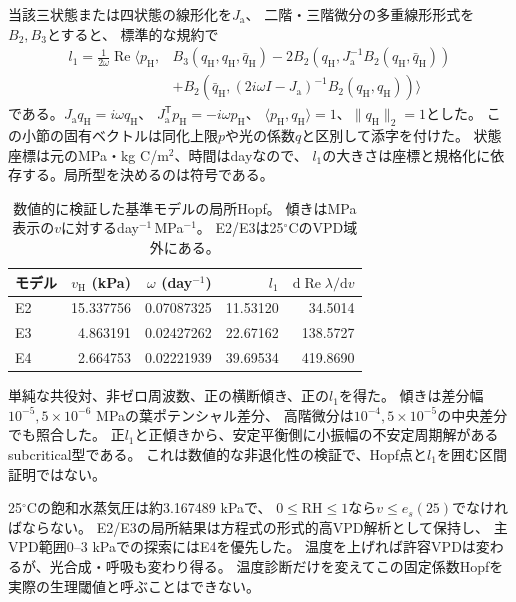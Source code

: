 \documentclass[a4paper,11pt]{ltjsarticle}
\newcommand{\dd}{\mathrm{d}}
\newcommand{\tr}{^{\mathsf T}}
\begin{document}
当該三状態または四状態の線形化を$J_{\mathrm a}$、
二階・三階微分の多重線形形式を$B_2,B_3$とすると、
標準的な規約\cite{kuznetsov}で
\begin{align}\label{eq:l1}
 l_1=\frac{1}{2\omega}\operatorname{Re}\langle p_{\mathrm H},
 &B_3(q_{\mathrm H},q_{\mathrm H},\bar q_{\mathrm H})
 -2B_2(q_{\mathrm H},J_{\mathrm a}^{-1}B_2(q_{\mathrm H},\bar q_{\mathrm H}))\nonumber\\
 &+B_2(\bar q_{\mathrm H},(2i\omega I-J_{\mathrm a})^{-1}
                B_2(q_{\mathrm H},q_{\mathrm H}))\rangle
\end{align}
である。$J_{\mathrm a}q_{\mathrm H}=i\omega q_{\mathrm H}$、
$J_{\mathrm a}\tr p_{\mathrm H}=-i\omega p_{\mathrm H}$、
$\langle p_{\mathrm H},q_{\mathrm H}\rangle=1$、$\|q_{\mathrm H}\|_2=1$とした。
この小節の固有ベクトルは同化上限$p$や光の係数$q$と区別して添字を付けた。
状態座標は元のMPa・kg C/m$^2$、時間はdayなので、
$l_1$の大きさは座標と規格化に依存する。局所型を決めるのは符号である。

\begin{table}[tb]
\centering
\caption{数値的に検証した基準モデルの局所Hopf。
傾きはMPa表示の$v$に対するday$^{-1}$\,MPa$^{-1}$。
E2/E3は25$^\circ$CのVPD域外にある。}\label{tab:hopf}
\begin{tabular}{lrrrr}
\toprule
モデル&$v_{\mathrm H}$ (kPa)&$\omega$ (day$^{-1}$)&$l_1$&$\dd\operatorname{Re}\lambda/\dd v$\\
\midrule
E2&15.337756&0.07087325&11.53120&34.5014\\
E3&4.863191&0.02427262&22.67162&138.5727\\
E4&2.664753&0.02221939&39.69534&419.8690\\
\bottomrule
\end{tabular}
\end{table}

単純な共役対、非ゼロ周波数、正の横断傾き、正の$l_1$を得た。
傾きは差分幅$10^{-5},5\times10^{-6}$ MPaの葉ポテンシャル差分、
高階微分は$10^{-4},5\times10^{-5}$の中央差分でも照合した。
正$l_1$と正傾きから、安定平衡側に小振幅の不安定周期解があるsubcritical型である。
これは数値的な非退化性の検証で、Hopf点と$l_1$を囲む区間証明ではない。

25$^\circ$Cの飽和水蒸気圧は約3.167489 kPaで、
$0\le\mathrm{RH}\le1$なら$v\le e_s(25)$でなければならない。
E2/E3の局所結果は方程式の形式的高VPD解析として保持し、
主VPD範囲0--3 kPaでの探索にはE4を優先した。
温度を上げれば許容VPDは変わるが、光合成・呼吸も変わり得る。
温度診断だけを変えてこの固定係数Hopfを実際の生理閾値と呼ぶことはできない。
\end{document}
